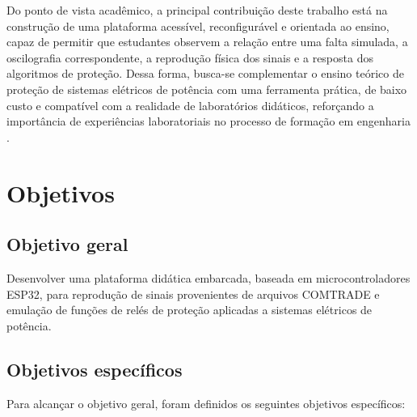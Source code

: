 Do ponto de vista acadêmico, a principal contribuição deste trabalho está na construção de uma plataforma acessível, reconfigurável e orientada ao ensino, capaz de permitir que estudantes observem a relação entre uma falta simulada, a oscilografia correspondente, a reprodução física dos sinais e a resposta dos algoritmos de proteção. Dessa forma, busca-se complementar o ensino teórico de proteção de sistemas elétricos de potência com uma ferramenta prática, de baixo custo e compatível com a realidade de laboratórios didáticos, reforçando a importância de experiências laboratoriais no processo de formação em engenharia \cite{feisel2005laboratory,ferris2013protectionlab}.

\section{Objetivos}

\subsection{Objetivo geral}

Desenvolver uma plataforma didática embarcada, baseada em microcontroladores ESP32, para reprodução de sinais provenientes de arquivos COMTRADE e emulação de funções de relés de proteção aplicadas a sistemas elétricos de potência.

\subsection{Objetivos específicos}

Para alcançar o objetivo geral, foram definidos os seguintes objetivos específicos:

